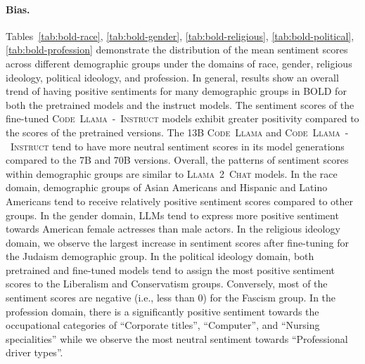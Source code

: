 \documentclass[10pt]{article}
\newcommand{\model}{\textsc{Code~Llama}\xspace}
\newcommand{\instmodel}{\textsc{Code~Llama~-~Instruct}\xspace}
\newcommand{\chatllama}{\textsc{Llama~2~Chat}\xspace}
\begin{document}
\paragraph{Bias.} Tables~\ref{tab:bold-race}, \ref{tab:bold-gender}, \ref{tab:bold-religious}, \ref{tab:bold-political}, \ref{tab:bold-profession} demonstrate the distribution of the mean sentiment scores across different
demographic groups under the domains of race, gender, religious ideology, political ideology, and
profession. 
In general, results show an overall trend of having positive sentiments for many demographic groups in BOLD for both the pretrained models and the instruct models. 
The sentiment scores of the fine-tuned \instmodel models exhibit greater positivity compared to the scores of the pretrained versions. 
The 13B \model and \instmodel tend to have more neutral sentiment scores in its model generations compared to the 7B and 70B versions. 
Overall, the patterns of sentiment scores within demographic groups are similar to \chatllama models. 
In the race domain, demographic groups of Asian Americans and Hispanic and Latino Americans tend to receive relatively positive sentiment scores compared to other groups. 
In the gender domain, LLMs tend to express more positive sentiment towards American female actresses than male actors. 
In the religious ideology domain, we observe the largest increase in sentiment scores after fine-tuning for the Judaism demographic group. 
In the political ideology domain, both pretrained and fine-tuned models tend to assign the most positive sentiment scores to the Liberalism and Conservatism groups. Conversely, most of the sentiment scores are negative (i.e., less than 0) for the Fascism group. 
In the profession domain, there is a significantly positive sentiment towards the occupational categories of ``Corporate titles'', ``Computer'', and ``Nursing specialities'' while we observe the most neutral sentiment towards ``Professional driver types''.
\end{document}
